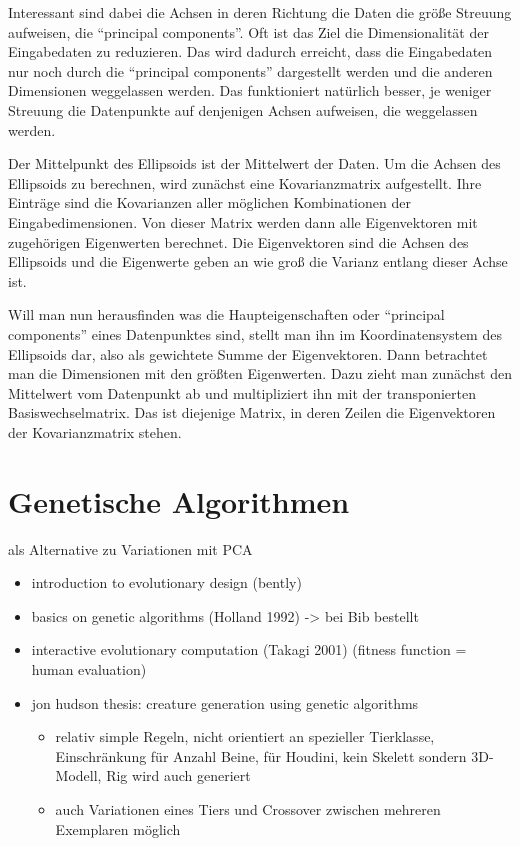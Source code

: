  Interessant sind dabei die Achsen in deren Richtung die Daten die größe Streuung aufweisen, die "`principal components"'. Oft ist das Ziel die Dimensionalität der Eingabedaten zu reduzieren. Das wird dadurch erreicht, dass die Eingabedaten nur noch durch die "`principal components"' dargestellt werden und die anderen Dimensionen weggelassen werden. Das funktioniert natürlich besser, je weniger Streuung die Datenpunkte auf denjenigen Achsen aufweisen, die weggelassen werden.
 
 Der Mittelpunkt des Ellipsoids ist der Mittelwert der Daten.
 Um die Achsen des Ellipsoids zu berechnen, wird zunächst eine Kovarianzmatrix aufgestellt. Ihre Einträge sind die Kovarianzen aller möglichen Kombinationen der Eingabedimensionen. Von dieser Matrix werden dann alle Eigenvektoren mit zugehörigen Eigenwerten berechnet.
 Die Eigenvektoren sind die Achsen des Ellipsoids und die Eigenwerte geben an wie groß die Varianz entlang dieser Achse ist.
 
 Will man nun herausfinden was die Haupteigenschaften oder "`principal components"' eines Datenpunktes sind, stellt man ihn im Koordinatensystem des Ellipsoids dar, also als gewichtete Summe der Eigenvektoren. Dann betrachtet man die Dimensionen mit den größten Eigenwerten. Dazu zieht man zunächst den Mittelwert vom Datenpunkt ab und multipliziert ihn mit der transponierten Basiswechselmatrix. Das ist diejenige Matrix, in deren Zeilen die Eigenvektoren der Kovarianzmatrix stehen.


\section{Genetische Algorithmen}

als Alternative zu Variationen mit PCA

\begin{itemize}
 \item introduction to evolutionary design (bently)
 \item basics on genetic algorithms (Holland 1992) -> bei Bib bestellt
 \item interactive evolutionary computation (Takagi 2001) (fitness function = human evaluation)
 \item jon hudson thesis: creature generation using genetic algorithms \cite{JonHudson}
   \begin{itemize}
    \item relativ simple Regeln, nicht orientiert an spezieller Tierklasse, Einschränkung für Anzahl Beine, für Houdini, kein Skelett sondern 3D-Modell, Rig wird auch generiert
    \item auch Variationen eines Tiers und Crossover zwischen mehreren Exemplaren möglich
   \end{itemize}
\end{itemize}


